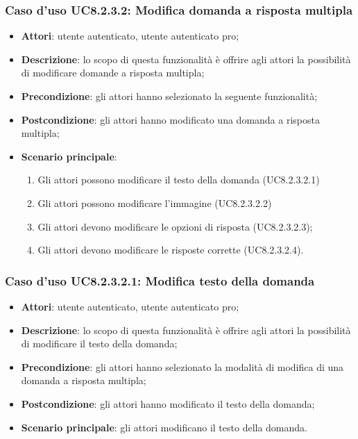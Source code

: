 \subsubsection{Caso d'uso UC8.2.3.2: Modifica domanda a risposta multipla}
	\begin{itemize}
		\item
			\textbf{Attori}: utente autenticato, utente autenticato pro;
		\item		
			\textbf{Descrizione}: lo scopo di questa funzionalità è offrire agli attori la possibilità di modificare domande a risposta multipla;
		\item
			\textbf{Precondizione}: gli attori hanno selezionato la seguente funzionalità; 
		\item
			\textbf{Postcondizione}: gli attori hanno modificato una domanda a risposta multipla;
		\item
			\textbf{Scenario principale}:
	       		\begin{enumerate}
	       			\item
	       			Gli attori possono modificare il testo della domanda (UC8.2.3.2.1)
	       			\item
	       			Gli attori possono modificare l'immagine (UC8.2.3.2.2)
	       			\item
	       			Gli attori devono modificare le opzioni di risposta (UC8.2.3.2.3);
					\item
					Gli attori devono modificare le risposte corrette (UC8.2.3.2.4).
	 			\end{enumerate}
	\end{itemize}

\subsubsection{Caso d'uso UC8.2.3.2.1: Modifica testo della domanda}
	\begin{itemize}
		\item
			\textbf{Attori}: utente autenticato, utente autenticato pro;
		\item		
			\textbf{Descrizione}: lo scopo di questa funzionalità è offrire agli attori la possibilità di modificare il testo della domanda;
		\item
			\textbf{Precondizione}: gli attori hanno selezionato la modalità di modifica di una domanda a risposta multipla; 
		\item
			\textbf{Postcondizione}: gli attori hanno modificato il testo della domanda;
		\item
			\textbf{Scenario principale}: gli attori modificano il testo della domanda. 
	 			
	\end{itemize}
	
